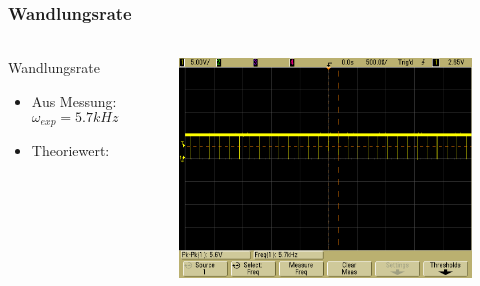 \begin{frame}
    \frametitle{Wandlungsrate}
    \framesubtitle{}
    \begin{columns}[c]
            \begin{block}{Wandlungsrate}
                \begin{itemize}
                    \item Aus Messung:  
                    \begin{equation*}
                        \omega_{exp} = 5.7kHz
                    \end{equation*}
                    \item Theoriewert:
                \end{itemize}
            \end{block}
            \begin{figure}[H]
            \begin{center}
                    \includegraphics[scale=0.15]{./img/oszi/scope_13.png}
            \end{center}
            \end{figure}
    \end{columns}
\end{frame}
